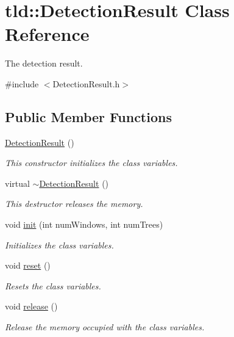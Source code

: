 \hypertarget{classtld_1_1DetectionResult}{\section{tld\-:\-:Detection\-Result Class Reference}
\label{classtld_1_1DetectionResult}
}


The detection result.  




{\ttfamily \#include $<$Detection\-Result.\-h$>$}

\subsection*{Public Member Functions}
\begin{DoxyCompactItemize}
\item 
\hyperlink{classtld_1_1DetectionResult_a603fdd04a64eb7e6c60ee7e9bb27d747}{Detection\-Result} ()
\begin{DoxyCompactList}\small\item\em This constructor initializes the class variables. \end{DoxyCompactList}\item 
virtual \hyperlink{classtld_1_1DetectionResult_a6e76739d206edcdbbac3d2da474fa5ff}{$\sim$\-Detection\-Result} ()
\begin{DoxyCompactList}\small\item\em This destructor releases the memory. \end{DoxyCompactList}\item 
void \hyperlink{classtld_1_1DetectionResult_a20c6fc21a478b99cf88b6e955931e530}{init} (int num\-Windows, int num\-Trees)
\begin{DoxyCompactList}\small\item\em Initializes the class variables. \end{DoxyCompactList}\item 
void \hyperlink{classtld_1_1DetectionResult_afeda3b61ba3d7ba3304b96baf65d184b}{reset} ()
\begin{DoxyCompactList}\small\item\em Resets the class variables. \end{DoxyCompactList}\item 
void \hyperlink{classtld_1_1DetectionResult_a23dc924e308f7a2d8f3795fb48fb6648}{release} ()
\begin{DoxyCompactList}\small\item\em Release the memory occupied with the class variables. \end{DoxyCompactList}\end{DoxyCompactItemize}

